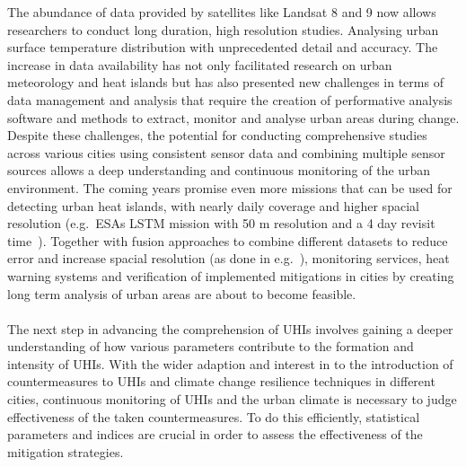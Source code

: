 \documentclass[12pt,a4paper, english,twoside]{scrartcl}
\begin{document}
  The abundance of data provided by satellites like Landsat 8 and 9 now allows researchers to conduct long duration, high resolution studies.
  Analysing urban surface temperature distribution with unprecedented detail and accuracy.
  The increase in data availability has not only facilitated research on urban meteorology and heat islands but has also presented new challenges in terms of data management and analysis that require the creation of performative analysis software and methods to extract, monitor and analyse urban areas during change.\\
  Despite these challenges, the potential for conducting comprehensive studies across various cities using consistent sensor data and combining multiple sensor sources allows a deep understanding and continuous monitoring of the urban environment.
  The coming years promise even more missions that can be used for detecting urban heat islands, with nearly daily coverage and higher spacial resolution (e.g.~ESAs LSTM mission with 50 m resolution and a 4 day revisit time~\cite{CEOS2024}). 
  Together with fusion approaches to combine different datasets to reduce error and increase spacial resolution (as done in e.g.~\cite{CampsValls2009}), monitoring services, heat warning systems and verification of implemented mitigations in cities by creating long term analysis of urban areas are about to become feasible.\\ \\ 
  The next step in advancing the comprehension of \glspl{UHI} involves gaining a deeper understanding of how various parameters contribute to the formation and intensity of \glspl{UHI}.
  With the wider adaption and interest in to the introduction of countermeasures to \glspl{UHI} and climate change resilience techniques in different cities, continuous monitoring of \glspl{UHI} and the urban climate is necessary to judge effectiveness of the taken countermeasures.
  To do this efficiently, statistical parameters and indices are crucial in order to assess the effectiveness of the mitigation strategies. 
\end{document}
